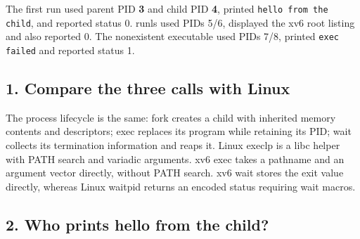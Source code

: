 The first run used parent PID \textbf{3} and child PID \textbf{4}, printed \texttt{hello from the child}, and reported status 0. runls used PIDs 5/6, displayed the xv6 root listing and also reported 0. The nonexistent executable used PIDs 7/8, printed \texttt{exec failed} and reported status 1.

\subsection{1. Compare the three calls with Linux}

\begin{table}[H]\end{table}

The process lifecycle is the same: fork creates a child with inherited memory contents and descriptors; exec replaces its program while retaining its PID; wait collects its termination information and reaps it. Linux execlp is a libc helper with PATH search and variadic arguments. xv6 exec takes a pathname and an argument vector directly, without PATH search. xv6 wait stores the exit value directly, whereas Linux waitpid returns an encoded status requiring wait macros.

\subsection{2. Who prints hello from the child?}

